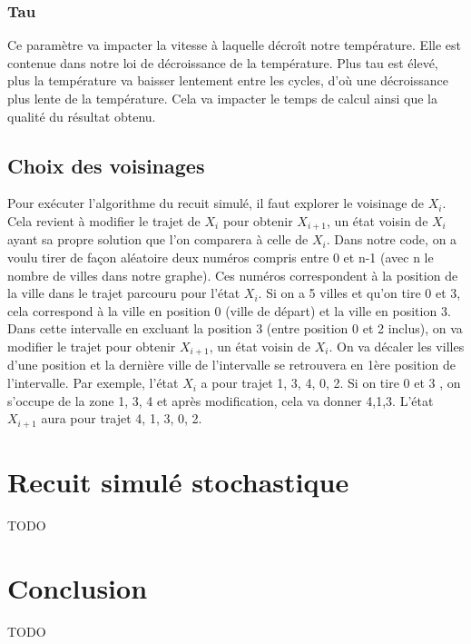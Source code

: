 \documentclass{article}
\begin{document}
\subsubsection{Tau}
 Ce paramètre va impacter la vitesse à laquelle décroît notre température. Elle est contenue dans notre loi de décroissance de la température. Plus tau est élevé, plus la température va baisser lentement entre les cycles, d’où une décroissance plus lente de la température. Cela va impacter le temps de calcul ainsi que la qualité du résultat obtenu. 
\subsection{Choix des voisinages}
Pour exécuter l’algorithme du recuit simulé, il faut explorer le voisinage de \(X_i\). Cela revient à modifier le trajet de \(X_i\) pour obtenir \(X_{i+1}\), un état voisin de \(X_i\) ayant sa propre solution que l’on comparera à celle de \(X_i\). Dans notre code, on a voulu tirer de façon aléatoire deux numéros compris entre 0 et n-1 (avec n le nombre de villes dans notre graphe). Ces numéros correspondent à la position de la ville dans le trajet parcouru pour l’état \(X_i\). Si on a 5 villes et qu’on tire 0 et 3, cela correspond à la ville en position 0 (ville de départ) et la ville en position 3.  Dans cette intervalle en excluant la position 3 (entre position 0 et 2 inclus), on va modifier le trajet pour obtenir \(X_{i+1}\), un état voisin de \(X_i\). On va décaler les villes d’une position et la dernière ville de l’intervalle se retrouvera en 1ère position de l’intervalle. 
Par exemple, l’état \(X_i\) a pour trajet 1, 3, 4, 0, 2. Si on tire 0 et 3 , on s’occupe de la zone 1, 3, 4 et après modification, cela va donner 4,1,3. L’état \(X_{i+1}\) aura pour trajet 4, 1, 3, 0, 2.
\section{Recuit simulé stochastique}
TODO
\section{Conclusion}
TODO
\end{document}
